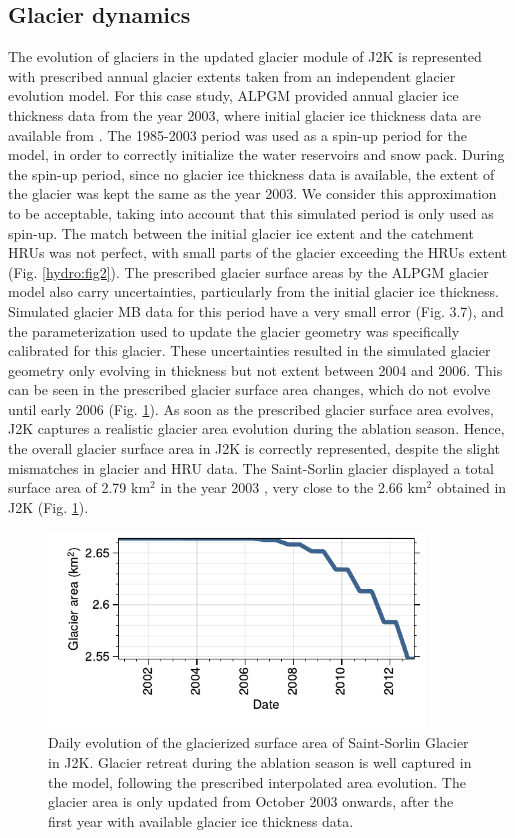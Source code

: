 \subsection{Glacier dynamics}

The evolution of glaciers in the updated glacier module of J2K is represented with prescribed annual glacier extents taken from an independent glacier evolution model. For this case study, ALPGM provided annual glacier ice thickness data from the year 2003, where initial glacier ice thickness data are available from \citet{farinotti_consensus_2019}. The 1985-2003 period was used as a spin-up period for the model, in order to correctly initialize the water reservoirs and snow pack. During the spin-up period, since no glacier ice thickness data is available, the extent of the glacier was kept the same as the year 2003. We consider this approximation to be acceptable, taking into account that this simulated period is only used as spin-up. The match between the initial glacier ice extent and the catchment HRUs was not perfect, with small parts of the glacier exceeding the HRUs extent (Fig. \ref{hydro:fig2}). The prescribed glacier surface areas by the ALPGM glacier model also carry uncertainties, particularly from the initial glacier ice thickness. Simulated glacier MB data for this period have a very small error (Fig. 3.7), and the parameterization used to update the glacier geometry was specifically calibrated for this glacier. These uncertainties resulted in the simulated glacier geometry only evolving in thickness but not extent between 2004 and 2006. This can be seen in the prescribed glacier surface area changes, which do not evolve until early 2006 (Fig. \ref{hydro:fig3}). As soon as the prescribed glacier surface area evolves, J2K captures a realistic glacier area evolution during the ablation season. Hence, the overall glacier surface area in J2K is correctly represented, despite the slight mismatches in glacier and HRU data. The Saint-Sorlin glacier displayed a total surface area of 2.79 km$^{2}$ in the year 2003 \citep{gardent_multitemporal_2014}, very close to the 2.66 km$^{2}$ obtained in J2K (Fig. \ref{hydro:fig3}). 

\begin{figure}[h]
\centering
\includegraphics[width=10cm]{Figures/hydro/Figure_3.pdf}
\caption{Daily evolution of the glacierized surface area of Saint-Sorlin Glacier in J2K. Glacier retreat during the ablation season is well captured in the model, following the prescribed interpolated area evolution. The glacier area is only updated from October 2003 onwards, after the first year with available glacier ice thickness data.} 
\label{hydro:fig3}
\end{figure}

